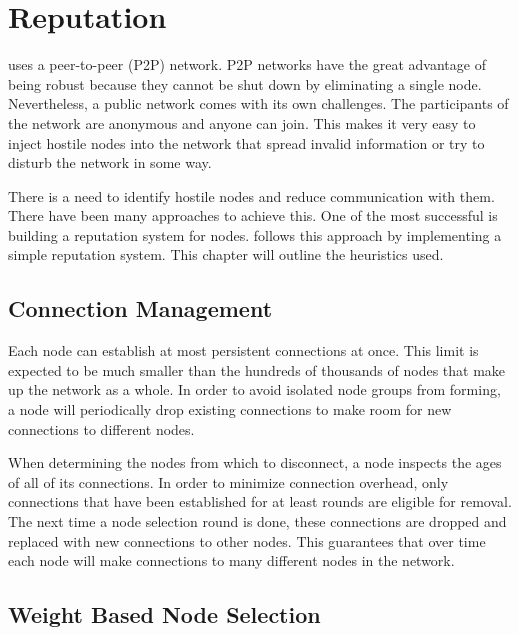 \section{Reputation}
\label{sec:reputation}


\codenamechapterfirstword uses a peer-to-peer (P2P) network.
P2P networks have the great advantage of being robust because they cannot be shut down by eliminating a single node.
Nevertheless, a public network comes with its own challenges.
The participants of the network are anonymous and anyone can join.
This makes it very easy to inject hostile nodes into the network that spread invalid information or try to disturb the network in some way.

There is a need to identify hostile nodes and reduce communication with them.
There have been many approaches to achieve this.
One of the most successful is building a reputation system for nodes.
\codenamespace follows this approach by implementing a simple reputation system.
This chapter will outline the heuristics used.

\subsection{Connection Management}
\label{sec:reputation:ConnectionManagement}

Each node can establish at most  persistent connections at once.
This limit is expected to be much smaller than the hundreds of thousands of nodes that make up the network as a whole.
In order to avoid isolated node groups from forming, a node will periodically drop existing connections to make room for new connections to different nodes.

When determining the nodes from which to disconnect, a node inspects the ages of all of its connections.
In order to minimize connection overhead, only connections that have been established for at least  rounds are eligible for removal.
The next time a node selection round is done, these connections are dropped and replaced with new connections to other nodes.
This guarantees that over time each node will make connections to many different nodes in the network.

\subsection{Weight Based Node Selection}
\label{sec:reputation:NodeSelection}

